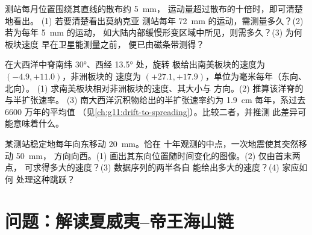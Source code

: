 \begin{exercise}[$\star\star\star$]\label{exo:g11:plate-motions:13}
测站每月位置围绕其直线的散布约 \qty{5}{mm}，
运动量超过散布的十倍时，即可清楚地看出。
(1) 若要清楚看出莫纳克亚
测站每年 \qty{72}{mm} 的运动，需测量多久？(2) 若为每年 \qty{5}{mm} 的运动，
如大陆内部缓慢形变区域中所见，则需多久？(3) 为何板块速度
早在卫星能测量之前，
便已由磁条带测得？
\end{exercise}

\begin{exercise}[$\star\star\star$]\label{exo:g11:plate-motions:14}
在大西洋中脊南纬 \ang{30}、西经 \ang{13.5} 处，旋转
极给出南美板块的速度为 $(-4.9, +11.0)$，非洲板块的
速度为 $(+27.1, +17.9)$，单位为毫米每年（东向、北向）。
(1) 求南美板块相对非洲板块的速度、其大小与
方向。(2) 推算该洋脊的与半扩张速率。
(3) 南大西洋沉积物给出的半扩张速率约为 \qty{1.9}{cm}
每年，系过去 6600 万年的平均值
（见\cref{ch:g11:drift-to-spreading}）。比较二者，并推测
此差异可能意味着什么。
\end{exercise}

\begin{exercise}[$\star\star\star$]\label{exo:g11:plate-motions:15}
某测站稳定地每年向东移动 \qty{20}{mm}。恰在
十年观测的中点，一次地震使其突然移动 \qty{50}{mm}，
方向向西。(1) 画出其东向位置随时间变化的图像。(2) 仅由首末两点，
可求得多大的速度？(3) 数据序列的两半各自
能给出多大的速度？(4) 家应如何
处理这种跳跃？
\end{exercise}

\section{问题：解读夏威夷–帝王海山链}

